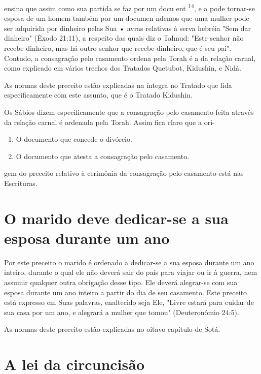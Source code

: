 \begin{itemize}
\begin{enumrate}
\begin{itemize}
\begin{itemize}
\begin{itemize}
ensina que assim como sua partida se faz por um docu ent
\textsuperscript{14}, e a pode tornar-se esposa de um homem também por
um documen ndemos que uma mulher pode ser adquirida por dinheiro pelas
Sua • avras relativas à serva hebréia "Sem dar dinheiro" (Êxodo 21:11),
a respeito das quais diz o Talmud: "Este senhor não recebe dinheiro, mas
há outro senhor que recebe dinheiro, que é seu pai". Contudo, a
consagração pelo casamento ordena pela Torah é a da relação carnal, como
explicado em vários trechos dos Tratados Quetubot, Kidushin, e Nidá.

As normas deste preceito estão explicadas na íntegra no Tratado que lida
especificamente com este assunto, que é o Tratado Kidushin.

Os Sábios dizem especificamente que a consagração pelo casamento feita
através da relação carnal é ordenada pela Torah. Assim fica claro que a
ori-


\begin{enumerate}
\def\labelenumi{\arabic{enumi}.}
\setcounter{enumi}{213}
\item
 
 O documento que concede o divórcio.
 
\item
 
 O documento que atesta a consagração pelo casamento.
 
\end{enumerate}




gem do preceito relativo à cerimônia da consagração pelo casamento está
nas Escrituras.

\section{O marido deve dedicar-se a sua esposa durante um ano}

Por este preceito o marido é ordenado a dedicar-se a sua esposa du­rante
um ano inteiro, durante o qual ele não deverá sair do país para viajar
ou ir à guerra, nem assumir qualquer outra obrigação desse tipo. Ele
deverá alegrar-se com sua esposa durante um ano inteiro a partir do dia
de seu casamento. Este preceito está expresso em Suas palavras,
enaltecido seja Ele, "Livre estará para cuidar de sua casa por um ano, e
alegrará a mulher que tomou" (Deutero­nômio 24:5).


As normas deste preceito estão explicadas no oitavo capítulo de Sotá.


\section{A lei da circuncisão}


\end{itemize}
\end{itemize}
\end{itemize}
\end{enumrate}
\end{itemize}
